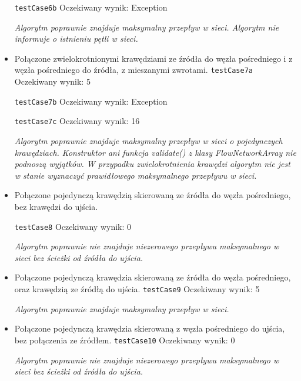 \begin{itemize}[nosep]
    \texttt{testCase6b}
    Oczekiwany wynik: Exception

    \emph{Algorytm poprawnie znajduje maksymalny przepływ w sieci. Algorytm nie informuje o istnieniu pętli w sieci.}

    \item Połączone zwielokrotnionymi krawędziami ze źródła do węzła pośredniego
    i z węzła pośredniego do źródła, z mieszanymi zwrotami.
    \texttt{testCase7a}
    Oczekiwany wynik: 5

    \texttt{testCase7b}
    Oczekiwany wynik: Exception

    \texttt{testCase7c}
    Oczekiwany wynik: 16

    \emph{Algorytm poprawnie znajduje maksymalny przepływ w sieci o pojedynczych krawędziach. Konstruktor ani funkcja validate() z klasy FlowNetworkArray nie podnoszą wyjątków. W przypadku zwielokrotnienia krawędzi algorytm nie jest w stanie wyznaczyć prawidłowego maksymalnego przepływu w sieci.}

    \item Połączone pojedynczą krawędzią skierowaną ze źródła do węzła
    pośredniego, bez krawędzi do ujścia.

    \texttt{testCase8}
    Oczekiwany wynik: 0

    \emph{Algorytm poprawnie nie znajduje niezerowego przepływu maksymalnego w sieci bez ścieżki od źródła do ujścia.}

    \item Połączone pojedynczą krawędzia skierowaną ze źródła do węzła
    pośredniego, oraz krawędzią ze źródłą do ujścia.
    \texttt{testCase9}
    Oczekiwany wynik: 5

    \emph{Algorytm poprawnie znajduje maksymalny przepływ w sieci.}

    \item Połączone pojedynczą krawędzia skierowaną z węzła pośredniego do
    ujścia, bez połączenia ze źródłem.
    \texttt{testCase10}
    Oczekiwany wynik: 0

    \emph{Algorytm poprawnie nie znajduje niezerowego przepływu maksymalnego w sieci bez ścieżki od źródła do ujścia.}
\end{itemize}


